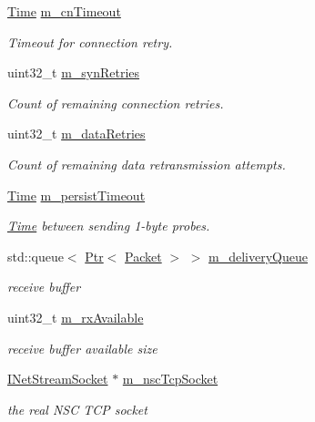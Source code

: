 \begin{DoxyCompactItemize}
\hyperlink{classns3_1_1Time}{Time} \hyperlink{classns3_1_1NscTcpSocketImpl_a3574c33a1e889a987c963198d6c119ce}{m\+\_\+cn\+Timeout}
\begin{DoxyCompactList}\small\item\em Timeout for connection retry. \end{DoxyCompactList}\item 
uint32\+\_\+t \hyperlink{classns3_1_1NscTcpSocketImpl_a3729630b866ed2e25d7514729ec5e33f}{m\+\_\+syn\+Retries}
\begin{DoxyCompactList}\small\item\em Count of remaining connection retries. \end{DoxyCompactList}\item 
uint32\+\_\+t \hyperlink{classns3_1_1NscTcpSocketImpl_a75843c5fe70b29ae0a5518762872fd6d}{m\+\_\+data\+Retries}
\begin{DoxyCompactList}\small\item\em Count of remaining data retransmission attempts. \end{DoxyCompactList}\item 
\hyperlink{classns3_1_1Time}{Time} \hyperlink{classns3_1_1NscTcpSocketImpl_afbc68b5330ba98dce8ae284a8ee1928a}{m\+\_\+persist\+Timeout}
\begin{DoxyCompactList}\small\item\em \hyperlink{classns3_1_1Time}{Time} between sending 1-\/byte probes. \end{DoxyCompactList}\item 
std\+::queue$<$ \hyperlink{classns3_1_1Ptr}{Ptr}$<$ \hyperlink{classns3_1_1Packet}{Packet} $>$ $>$ \hyperlink{classns3_1_1NscTcpSocketImpl_a51a043d0ac1976806daddd23360a8eb8}{m\+\_\+delivery\+Queue}
\begin{DoxyCompactList}\small\item\em receive buffer \end{DoxyCompactList}\item 
uint32\+\_\+t \hyperlink{classns3_1_1NscTcpSocketImpl_a89af3e7d49f82fd1c31c5ee46e0cd480}{m\+\_\+rx\+Available}
\begin{DoxyCompactList}\small\item\em receive buffer available size \end{DoxyCompactList}\item 
\hyperlink{structINetStreamSocket}{I\+Net\+Stream\+Socket} $\ast$ \hyperlink{classns3_1_1NscTcpSocketImpl_a540a25a7e3ea5777872b16662da3e616}{m\+\_\+nsc\+Tcp\+Socket}
\begin{DoxyCompactList}\small\item\em the real N\+SC T\+CP socket \end{DoxyCompactList}\item 

\end{DoxyCompactItemize}
